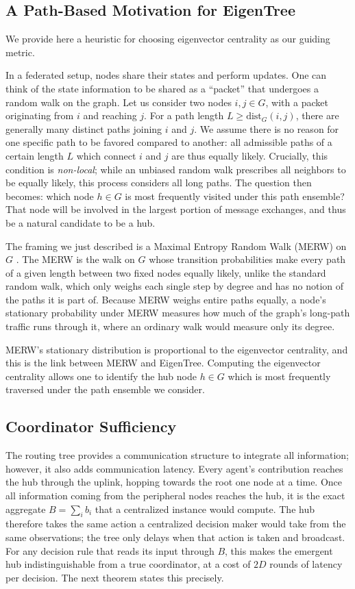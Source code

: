 \documentclass[letterpaper]{article} %
\begin{document}
\subsection{A Path-Based Motivation for EigenTree}
\label{sec:merw}

We provide here a heuristic for choosing eigenvector centrality as our guiding metric.

In a federated setup, nodes share their states and perform updates. One can
think of the state information to be shared as a ``packet'' that undergoes a
random walk on the graph. Let us consider two nodes $i,j \in G$, with a packet
originating from $i$ and reaching $j$. For a path length $L \geq
\mathrm{dist}_G(i, j)$, there are generally many distinct paths joining $i$ and
$j$. We assume there is no reason for one specific path to be favored compared
to another: all admissible paths of a certain length $L$ which connect $i$ and
$j$ are thus equally likely. Crucially, this condition is \emph{non-local};
while an unbiased random walk prescribes all neighbors to be equally likely,
this process considers all long paths. The question then becomes: which node
$h\in G$ is most frequently visited under this path ensemble? That node will be
involved in the largest portion of message exchanges, and thus be a natural
candidate to be a hub.

The framing we just described is a Maximal Entropy Random Walk (MERW) on $G$
\citep{burda2009localization}. The MERW is the walk on $G$ whose transition
probabilities make every path of a given length between two fixed nodes equally
likely, unlike the standard random walk, which only weighs each single step by
degree and has no notion of the paths it is part of. Because MERW weighs entire
paths equally, a node's stationary probability under MERW measures how much of
the graph's long-path traffic runs through it, where an ordinary walk would
measure only its degree.

MERW's stationary distribution is proportional to the eigenvector centrality,
and this is the link between MERW and EigenTree. Computing the eigenvector
centrality allows one to identify the hub node $h\in G$ which is most
frequently traversed under the path ensemble we consider.

\subsection{Coordinator Sufficiency}

The routing tree provides a communication structure to integrate all information;
however, it also adds communication latency. Every agent's contribution reaches
the hub through the uplink, hopping towards the root one node at a time. Once
all information coming from the peripheral nodes reaches the hub, it is the
exact aggregate $B = \sum_i b_i$ that a centralized instance would compute. The
hub therefore takes the same action a centralized decision maker would take
from the same observations; the tree only delays when that action is taken and
broadcast. For any decision rule that reads its input through $B$, this makes
the emergent hub indistinguishable from a true coordinator, at a cost of $2D$
rounds of latency per decision. The next theorem states this precisely.
\end{document}

